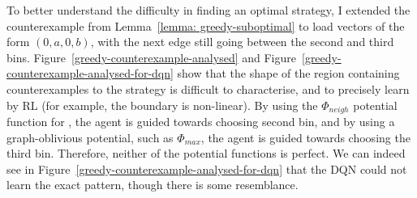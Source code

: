 To better understand the difficulty in finding an optimal strategy, I extended the \CycleGraph counterexample from Lemma~\ref{lemma: greedy-suboptimal} to load vectors of the form $(0, a, 0, b)$, with the next edge still going between the second and third bins. Figure~\ref{greedy-counterexample-analysed} and Figure~\ref{greedy-counterexample-analysed-for-dqn} show that the shape of the region containing counterexamples to the \Greedy strategy is difficult to characterise, and to precisely learn by RL (for example, the boundary is non-linear). By using the $\Phi_{neigh}$ potential function for \DQL, the agent is guided towards choosing second bin, and by using a graph-oblivious potential, such as $\Phi_{max}$, the agent is guided towards choosing the third bin. Therefore, neither of the potential functions is perfect. We can indeed see in Figure~\ref{greedy-counterexample-analysed-for-dqn} that the DQN could not learn the exact pattern, though there is some resemblance.


